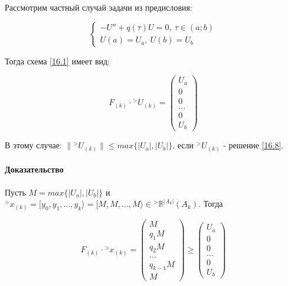 \documentclass[__main__.tex]{subfiles}
\begin{document}
Рассмотрим частный случай задачи из предисловия:

\begin{equation}\label{16.7}
\begin{cases}
-U''+q\left(\tau\right) U =0, \ \tau \in \left(a;b\right) \\
U\left(a\right) = U_a, \ U\left(b\right) = U_b
\end{cases}
\end{equation}

Тогда схема \ref{16.1} имеет вид:

\begin{equation}\label{16.8}
F_{\left(k\right)} \cdot {}^>U_{\left(k\right)} = \left(
\begin{matrix}
U_a \\ 0 \\ 0 \\ ... \\ 0 \\ U_b
\end{matrix}
\right)
\end{equation}

В этому случае: $\| {}^>U_{\left(k\right)} \| \leq max \{ \left|U_a\right|, \left|U_b\right| \}$, если ${}^>U_{\left(k\right)}$ - решение \ref{16.8}.

\paragraph{Доказательство}

Пусть $M = max \{ \left|U_a\right|, \left|U_b\right| \}$ и ${}^> x_{\left(k\right)} = [y_0, y_1, ..., y_k \rangle = [M,M,...,M \rangle \in {}^> \mathbb{R}^{\left|A_k\right|} \left(A_k\right)$. Тогда 

$$
F_{\left(k\right)} \cdot {}^>x_{\left(k\right)} = \left(
\begin{matrix}
M \\ q_1 M \\ q_2 M \\ ... \\ q_{k-1} M \\ M
\end{matrix}
\right) \geq \left(
\begin{matrix}
U_a \\ 0 \\ 0 \\... \\ 0 \\ U_b
\end{matrix}
\right)
$$
\end{document}
